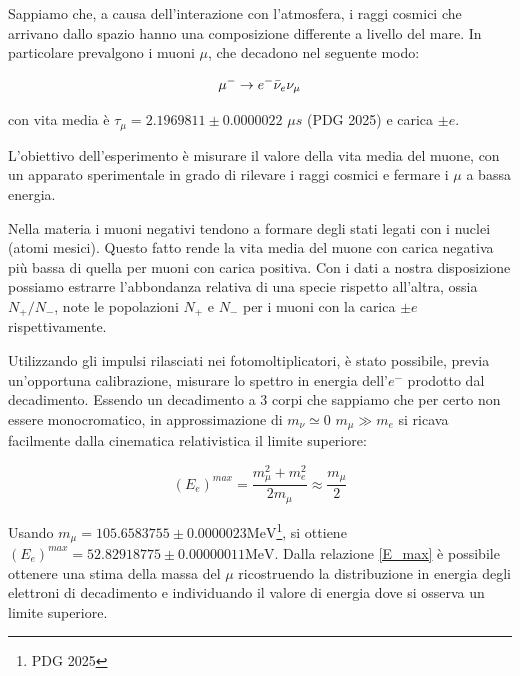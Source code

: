 \documentclass[10pt,a4paper]{article}
\begin{document}
\begin{flushleft}
Sappiamo che, a causa dell'interazione con l'atmosfera, i raggi cosmici che arrivano dallo spazio hanno una composizione differente a livello del mare. In particolare prevalgono i muoni $\mu$, che decadono nel seguente modo:

\begin{equation}\label{mu_decay}
    \ce{$\mu^{-}\rightarrow e^{-}\bar \nu_e \nu_{\mu}$}
\end{equation}

con vita media è $\tau_{\mu} = 2.1969811 \pm 0.0000022 $ $\mu s$ (PDG 2025) e carica $\pm e$.

L'obiettivo dell'esperimento è misurare il valore della vita media del muone, con un apparato sperimentale in grado di rilevare i raggi cosmici e fermare i $\mu$ a bassa energia. 

Nella materia i muoni negativi tendono a formare degli stati legati con i nuclei (atomi mesici). Questo fatto rende la vita media del muone con carica negativa più bassa di quella per muoni con carica positiva. Con i dati a nostra disposizione possiamo estrarre l'abbondanza relativa di una specie rispetto all'altra, ossia $N_+/N_-$, note le popolazioni $N_+$ e $N_-$ per i muoni con la carica $\pm e$ rispettivamente.

Utilizzando gli impulsi rilasciati nei fotomoltiplicatori, è stato possibile, previa un'opportuna calibrazione, misurare lo spettro in energia dell'$e^{-}$ prodotto dal decadimento. Essendo un decadimento a 3 corpi che sappiamo che per certo non essere monocromatico, in approssimazione di $m_{\nu} \simeq 0 $ $ m_\mu \gg m_e $ si ricava facilmente dalla cinematica relativistica il limite superiore:

\begin{equation}\label{E_max}
    (E_e)^{max} = \frac{m_{\mu}^2+m_{e}^2}{2m_{\mu}} \approx \frac{m_\mu}{2}
\end{equation}



Usando $m_\mu = 105.6583755 \pm 0.0000023\text{MeV}$\footnote{PDG 2025}, si ottiene  $(E_e)^{max} =52.82918775 \pm 0.00000011 \text{MeV}$. 
Dalla relazione \ref{E_max} è possibile ottenere una stima della massa del $\mu$ ricostruendo la distribuzione in energia degli elettroni di decadimento e individuando il valore di energia dove si osserva un limite superiore.

\end{flushleft}
\newpage
\end{document}
